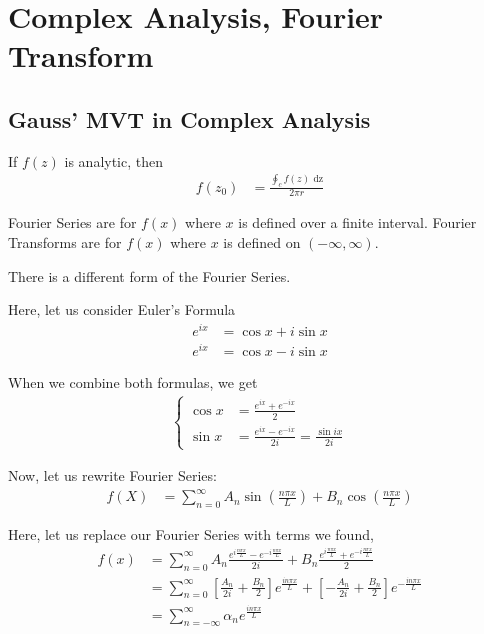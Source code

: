 \newpage
\section{Complex Analysis, Fourier Transform}

\subsection{Gauss' MVT in Complex Analysis}

If $f(z)$ is analytic, then
%
\begin{align}
  f(z_0) & =
  \frac
  {
    \oint_c f(z) \text{ dz}
  }
  {
    2 \pi r
  }
\end{align}

Fourier Series are for $f(x)$ where $x$ is defined over a finite interval.
Fourier Transforms are for $f(x)$ where $x$ is defined on $(-\infty, \infty)$.

There is a different form of the Fourier Series.

Here, let us consider Euler's Formula
%
\begin{align}
  e^{ix} & = \cos x + i \sin x\\
  e^{ix} & = \cos x - i \sin x
\end{align}

When we combine both formulas, we get
%
\begin{align}
  \begin{cases}
    \cos x& = \frac{e^{ix} + e^{-ix}}{2}\\
    \sin x & = \frac{e^{ix} - e^{-ix}}{2i} = \frac{\sin ix}{2i}
  \end{cases}
\end{align}

Now, let us rewrite Fourier Series:
%
\begin{align}
  f(X) & = \sum^\infty_{n = 0} A_n \sin\left(\frac{n \pi x}{L}\right) + B_n \cos\left(\frac{n \pi x}{L}\right)
\end{align}

Here, let us replace our Fourier Series with terms we found,
%
\begin{align}
  f(x) & =
  \sum^\infty_{n = 0}
  A_n \frac
  {
    e^{i \frac{n \pi x}{L}} - e^{-i \frac{n \pi x}{L}}
  }
  {
    2 i
  }
  + B_n \frac
  {
    e^{i\frac{n \pi x}{L}} + e^{-i \frac{n \pi x}{L}}
  }
  {
    2
  }\\
  & =
  \sum^\infty_{n = 0}
  \left[
    \frac{A_n}{2i} + \frac{B_n}{2}
  \right]
  e^{\frac{i n \pi x}{L}}
  +
  \left[
    - \frac{A_n}{2i} + \frac{B_n}{2}
  \right]
  e^{- \frac{i n \pi x}{L}}\\
  & = \sum^\infty_{n = -\infty} \alpha_n e^{\frac{i n \pi x}{L}}
\end{align}

